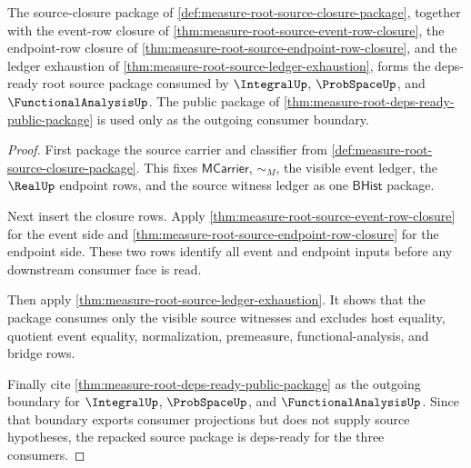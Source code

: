 \begin{theorem}
\label{thm:measure-root-source-deps-ready-package}
The source-closure package of
\autoref{def:measure-root-source-closure-package}, together with the event-row
closure of \autoref{thm:measure-root-source-event-row-closure}, the
endpoint-row closure of \autoref{thm:measure-root-source-endpoint-row-closure},
and the ledger exhaustion of
\autoref{thm:measure-root-source-ledger-exhaustion}, forms the deps-ready root
source package consumed by $\IntegralUp$, $\ProbSpaceUp$, and
$\FunctionalAnalysisUp$. The public package of
\autoref{thm:measure-root-deps-ready-public-package} is used only as the
outgoing consumer boundary.
\end{theorem}
\begin{proof}
First package the source carrier and classifier from
\autoref{def:measure-root-source-closure-package}. This fixes
$\mathsf{MCarrier}$, $\sim_M$, the visible event ledger, the $\RealUp$
endpoint rows, and the source witness ledger as one $\mathsf{BHist}$ package.

Next insert the closure rows. Apply
\autoref{thm:measure-root-source-event-row-closure} for the event side and
\autoref{thm:measure-root-source-endpoint-row-closure} for the endpoint side.
These two rows identify all event and endpoint inputs before any downstream
consumer face is read.

Then apply \autoref{thm:measure-root-source-ledger-exhaustion}. It shows that
the package consumes only the visible source witnesses and excludes host
equality, quotient event equality, normalization, premeasure,
functional-analysis, and bridge rows.

Finally cite \autoref{thm:measure-root-deps-ready-public-package} as the
outgoing boundary for $\IntegralUp$, $\ProbSpaceUp$, and
$\FunctionalAnalysisUp$. Since that boundary exports consumer projections but
does not supply source hypotheses, the repacked source package is deps-ready
for the three consumers.
\end{proof}
